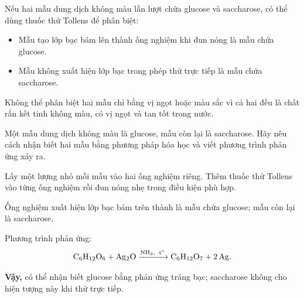 Nếu hai mẫu dung dịch không màu lần lượt chứa glucose và saccharose, có thể dùng thuốc thử Tollens để phân biệt:
\begin{itemize}
\item Mẫu tạo lớp bạc bám lên thành ống nghiệm khi đun nóng là mẫu chứa glucose.
\item Mẫu không xuất hiện lớp bạc trong phép thử trực tiếp là mẫu chứa saccharose.
\end{itemize}

Không thể phân biệt hai mẫu chỉ bằng vị ngọt hoặc màu sắc vì cả hai đều là chất rắn kết tinh không màu, có vị ngọt và tan tốt trong nước.

\begin{vidu}
Một mẫu dung dịch không màu là glucose, mẫu còn lại là saccharose. Hãy nêu cách nhận biết hai mẫu bằng phương pháp hóa học và viết phương trình phản ứng xảy ra.
\end{vidu}
\begin{loigiai}
Lấy một lượng nhỏ mỗi mẫu vào hai ống nghiệm riêng. Thêm thuốc thử Tollens vào từng ống nghiệm rồi đun nóng nhẹ trong điều kiện phù hợp.

Ống nghiệm xuất hiện lớp bạc bám trên thành là mẫu chứa glucose; mẫu còn lại là saccharose.

Phương trình phản ứng:
\[
\ce{C6H12O6 + Ag2O ->[NH3,\ t^\circ] C6H12O7 + 2Ag}.
\]

\textbf{Vậy,} có thể nhận biết glucose bằng phản ứng tráng bạc; saccharose không cho hiện tượng này khi thử trực tiếp.
\end{loigiai}
